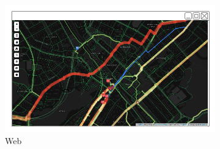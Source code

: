 

\begin{figure}[ht]
    \centering
    \begin{subfigure}[b]{0.6\textwidth}
        \includegraphics[width=\textwidth]
          {img/c03-merge/png/web-basemap-merge.png}
        \caption{Web}
    \end{subfigure}
    ~
    \begin{subfigure}[b]{0.2\textwidth}

\end{subfigure}
\end{figure}
